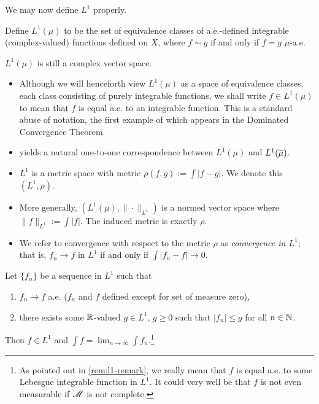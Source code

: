 \documentclass[12pt]{article} %
\begin{document}
We may now define $L^1$ properly.

\begin{definition}
    Define $L^1(\mu)$ to be the set of equivalence classes of a.e.-defined integrable (complex-valued) functions defined on $X$, where $f \sim g$ if and only if $f = g$ $\mu$-a.e.
\end{definition}

\begin{remark}\label{rem:l1-remark}
    $L^1(\mu)$ is still a complex vector space.  \begin{itemize}
        \item Although we will henceforth view $L^1(\mu)$ as a space of equivalence classes, each class consisting of purely integrable functions, we shall write $f \in L^1(\mu)$ to mean that $f$ is equal a.e. to an integrable function. This is a standard abuse of notation, the first example of which appears in the Dominated Convergence Theorem.
        \item {} yields a natural one-to-one correspondence between $L^1(\mu)$ and $L^1(\overline{\mu})$.
        \item $L^1$ is a metric space with metric $\rho(f, g) := \int |f-g|$. We denote this $(L^1, \rho)$.
        \item More generally, $(L^1(\mu), \|\cdot\|_{L^1})$ is a normed vector space where $\|f\|_{L^1} := \int |f|$. The induced metric is exactly $\rho$.
        \item We refer to convergence with respect to the metric $\rho$ as \textit{convergence in $L^1$}; that is, $f_n \to f$ in $L^1$ if and only if $\int |f_n - f| \to 0$.
    \end{itemize}
\end{remark}

\begin{theorem}
    Let $\{f_n\}$ be a sequence in $L^1$ such that \begin{enumerate}
        \item $f_n \to f$ a.e. ($f_n$ and $f$ defined except for set of measure zero),
        \item there exists some $\mathbb{R}$-valued $g \in L^1$, $g \geq 0$ such that $|f_n| \leq g$ for all $n \in \mathbb{N}$.
    \end{enumerate}
    Then $f \in L^1$ and $\int f = \lim_{n\to \infty} \int f_n$.\footnote{As pointed out in \cref{rem:l1-remark}, we really mean that $f$ is equal a.e. to some Lebesgue integrable function in $L^1$. It could very well be that $f$ is not even measurable if $\mathscr{M}$ is not complete.}
\end{theorem}
\end{document}

